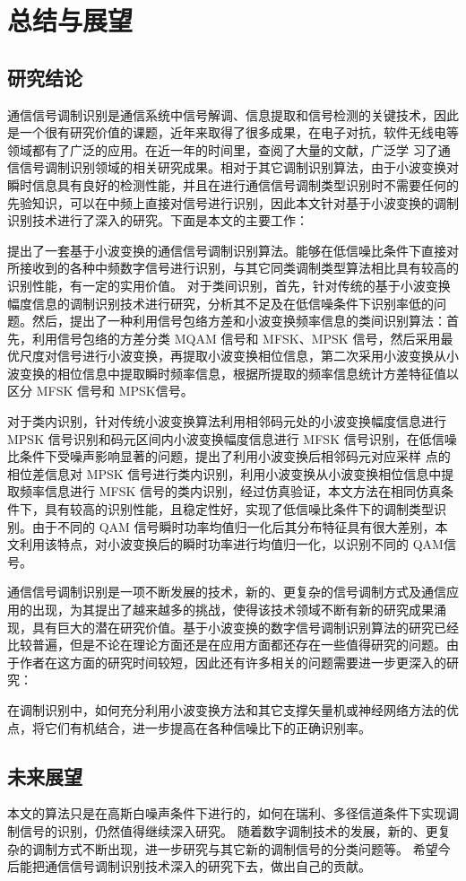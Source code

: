 \chapter{总结与展望}
\section{研究结论}
通信信号调制识别是通信系统中信号解调、信息提取和信号检测的关键技术，因此是一个很有研究价值的课题，近年来取得了很多成果，在电子对抗，软件无线电等领域都有了广泛的应用。在近一年的时间里，查阅了大量的文献，广泛学
习了通信信号调制识别领域的相关研究成果。相对于其它调制识别算法，由于小波变换对瞬时信息具有良好的检测性能，并且在进行通信信号调制类型识别时不需要任何的先验知识，可以在中频上直接对信号进行识别，因此本文针对基于小波变换的调制识别技术进行了深入的研究。下面是本文的主要工作： \par

提出了一套基于小波变换的通信信号调制识别算法。能够在低信噪比条件下直接对所接收到的各种中频数字信号进行识别，与其它同类调制类型算法相比具有较高的识别性能，有一定的实用价值。 对于类间识别，首先，针对传统的基于小波变换幅度信息的调制识别技术进行研究，分析其不足及在低信噪条件下识别率低的问题。然后，提出了一种利用信号包络方差和小波变换频率信息的类间识别算法：首先，利用信号包络的方差分类 MQAM 信号和 MFSK、MPSK 信号，然后采用最优尺度对信号进行小波变换，再提取小波变换相位信息，第二次采用小波变换从小波变换的相位信息中提取瞬时频率信息，根据所提取的频率信息统计方差特征值以区分 MFSK 信号和 MPSK信号。 \par

对于类内识别，针对传统小波变换算法利用相邻码元处的小波变换幅度信息进行 MPSK 信号识别和码元区间内小波变换幅度信息进行 MFSK 信号识别，在低信噪比条件下受噪声影响显著的问题，提出了利用小波变换后相邻码元对应采样
点的相位差信息对 MPSK 信号进行类内识别，利用小波变换从小波变换相位信息中提取频率信息进行 MFSK 信号的类内识别，经过仿真验证，本文方法在相同仿真条件下，具有较高的识别性能，且稳定性好，实现了低信噪比条件下的调制类型识别。由于不同的 QAM 信号瞬时功率均值归一化后其分布特征具有很大差别，本文利用该特点，对小波变换后的瞬时功率进行均值归一化，以识别不同的 QAM信号。 \par

通信信号调制识别是一项不断发展的技术，新的、更复杂的信号调制方式及通信应用的出现，为其提出了越来越多的挑战，使得该技术领域不断有新的研究成果涌现，具有巨大的潜在研究价值。基于小波变换的数字信号调制识别算法的研究已经比较普遍，但是不论在理论方面还是在应用方面都还存在一些值得研究的问题。由于作者在这方面的研究时间较短，因此还有许多相关的问题需要进一步更深入的研究： \par

在调制识别中，如何充分利用小波变换方法和其它支撑矢量机或神经网络方法的优点，将它们有机结合，进一步提高在各种信噪比下的正确识别率。 \par

\section{未来展望}
本文的算法只是在高斯白噪声条件下进行的，如何在瑞利、多径信道条件下实现调制信号的识别，仍然值得继续深入研究。 随着数字调制技术的发展，新的、更复杂的调制方式不断出现，进一步研究与其它新的调制信号的分类问题等。 
希望今后能把通信信号调制识别技术深入的研究下去，做出自己的贡献。\par
